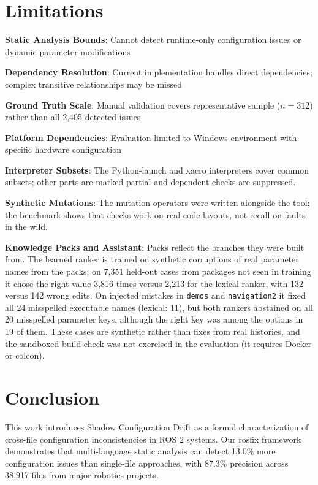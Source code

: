 \documentclass[conference]{IEEEtran}
\newcommand{\code}[1]{\texttt{#1}}
\begin{document}
\section{Limitations}

\textbf{Static Analysis Bounds}: Cannot detect runtime-only configuration issues or dynamic
parameter modifications

\textbf{Dependency Resolution}: Current implementation handles direct dependencies; complex
transitive relationships may be missed

\textbf{Ground Truth Scale}: Manual validation covers representative sample ($n=312$) rather than
all 2,405 detected issues

\textbf{Platform Dependencies}: Evaluation limited to Windows environment with specific hardware
configuration

\textbf{Interpreter Subsets}: The Python-launch and xacro interpreters cover common subsets;
other parts are marked partial and dependent checks are suppressed.

\textbf{Synthetic Mutations}: The mutation operators were written alongside the tool; the
benchmark shows that checks work on real code layouts, not recall on faults in the wild.

\textbf{Knowledge Packs and Assistant}: Packs reflect the branches they were built from. The
learned ranker is trained on synthetic corruptions of real parameter names from the packs; on
7,351 held-out cases from packages not seen in training it chose the right value 3,816 times
versus 2,213 for the lexical ranker, with 132 versus 142 wrong edits. On injected mistakes in
\code{demos} and \code{navigation2} it fixed all 24 misspelled executable names (lexical: 11), but
both rankers abstained on all 20 misspelled parameter keys, although the right key was among the
options in 19 of them. These cases are synthetic rather than fixes from real histories, and the
sandboxed build check was not exercised in the evaluation (it requires Docker or colcon).

\section{Conclusion}

This work introduces Shadow Configuration Drift as a formal characterization of cross-file
configuration inconsistencies in ROS 2 systems. Our rosfix framework demonstrates that
multi-language static analysis can detect 13.0\% more configuration issues than single-file
approaches, with 87.3\% precision across 38,917 files from major robotics projects.
\end{document}

